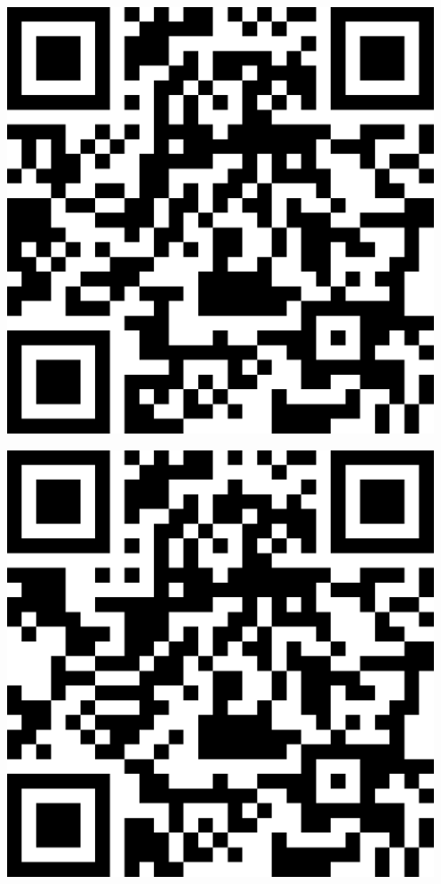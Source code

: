 \documentclass[letterpaper]{article}
\begin{document}
 \endgroup 
 \vspace*{\fill} 
 \pagebreak 
{} 
 \vspace*{\fill} 
 \begingroup 
 \centerline{\includegraphics[scale=1,width=5in,height=5in]{ICL5.png}} 
 \endgroup 
 \vspace*{\fill} 
 \pagebreak 
{} 
 \vspace*{\fill} 
 \begingroup 
 \centerline{\includegraphics[scale=1,width=5in,height=5in]{ICL6.png}} 
\end{document}
